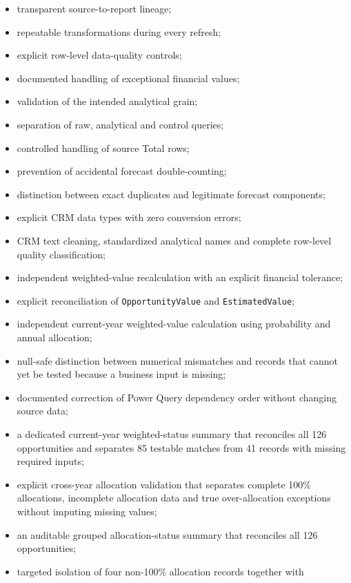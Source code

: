 \documentclass[11pt,a4paper]{article}
\begin{document}
\begin{itemize}[leftmargin=7mm,itemsep=3pt]
    \item transparent source-to-report lineage;
    \item repeatable transformations during every refresh;
    \item explicit row-level data-quality controls;
    \item documented handling of exceptional financial values;
    \item validation of the intended analytical grain;
    \item separation of raw, analytical and control queries;
    \item controlled handling of source Total rows;
    \item prevention of accidental forecast double-counting;
    \item distinction between exact duplicates and legitimate forecast
    components;
    \item explicit CRM data types with zero conversion errors;
    \item CRM text cleaning, standardized analytical names and complete
    row-level quality classification;
    \item independent weighted-value recalculation with an explicit financial
    tolerance;
    \item explicit reconciliation of \texttt{OpportunityValue} and
    \texttt{EstimatedValue};
    \item independent current-year weighted-value calculation using probability
    and annual allocation;
    \item null-safe distinction between numerical mismatches and records that
    cannot yet be tested because a business input is missing;
    \item documented correction of Power Query dependency order without changing
    source data;
    \item a dedicated current-year weighted-status summary that reconciles all
    126 opportunities and separates 85 testable matches from 41 records with
    missing required inputs;
    \item explicit cross-year allocation validation that separates complete
    100\% allocations, incomplete allocation data and true over-allocation
    exceptions without imputing missing values;
    \item an auditable grouped allocation-status summary that reconciles all
    126 opportunities;
    \item targeted isolation of four non-100\% allocation records together with

\end{itemize}
\end{document}
